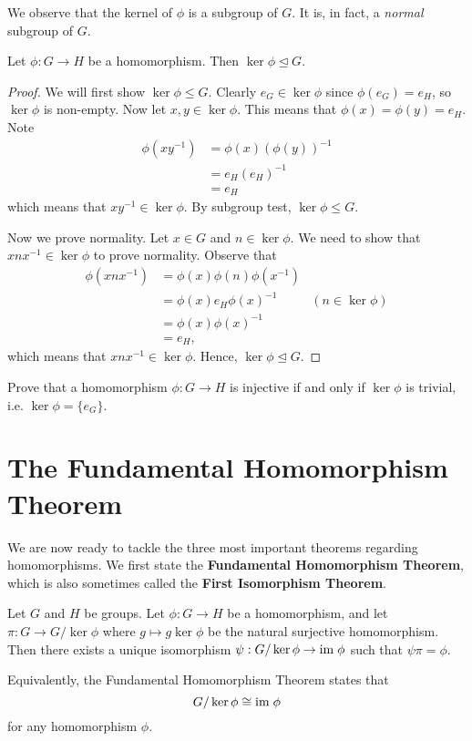 We observe that the kernel of $\phi$ is a subgroup of $G$. It is, in fact, a \textit{normal} subgroup of $G$.
\begin{proposition}\label{prop-kernel-is-normal-subgroup-of-domain}
    Let $\phi: G \to H$ be a homomorphism. Then $\ker\phi \unlhd G$.
\end{proposition}
\begin{proof}
    We will first show $\ker\phi\leq G$. Clearly $e_G \in \ker\phi$ since $\phi(e_G) = e_H$, so $\ker\phi$ is non-empty. Now let $x, y \in \ker\phi$. This means that $\phi(x) = \phi(y) = e_H$. Note
    \begin{align*}
        \phi(xy^{-1}) &= \phi(x)\left(\phi(y)\right)^{-1}\\
        &= e_H(e_H)^{-1}\\
        &= e_H
    \end{align*}
    which means that $xy^{-1}\in\ker\phi$. By subgroup test, $\ker\phi\leq G$.

    Now we prove normality. Let $x \in G$ and $n \in \ker\phi$. We need to show that $xnx^{-1}\in\ker\phi$ to prove normality. Observe that
    \begin{align*}
        \phi(xnx^{-1}) &= \phi(x)\phi(n)\phi(x^{-1})\\
        &= \phi(x)e_H\phi(x)^{-1} & (n \in \ker\phi)\\
        &= \phi(x)\phi(x)^{-1}\\
        &= e_H,
    \end{align*}
    which means that $xnx^{-1} \in \ker\phi$. Hence, $\ker\phi \unlhd G$.
\end{proof}

\begin{exercise}\label{exercise-trivial-kernel-means-injective}
    Prove that a homomorphism $\phi:G\to H$ is injective if and only if $\ker \phi$ is trivial, i.e. $\ker \phi = \{e_G\}$.
\end{exercise}

\section{The Fundamental Homomorphism Theorem}
We are now ready to tackle the three most important theorems regarding homomorphisms. We first state the \textbf{Fundamental Homomorphism Theorem}, which is also sometimes called the \textbf{First Isomorphism Theorem}.
\begin{theorem}\label{thrm-isomorphism-1}
    Let $G$ and $H$ be groups. Let $\phi: G \to H$ be a homomorphism, and let $\pi: G \to G/\ker\phi$ where $g\mapsto g\ker\phi$ be the natural surjective homomorphism. Then there exists a unique isomorphism $\psi: G/\ker\phi \to \mathrm{im}\;\phi$ such that $\psi\pi = \phi$.
\end{theorem}
\begin{remark}
    Equivalently, the Fundamental Homomorphism Theorem states that
    \[
        G/\ker\phi \cong \mathrm{im}\;\phi
    \]
    for any homomorphism $\phi$.
\end{remark}

